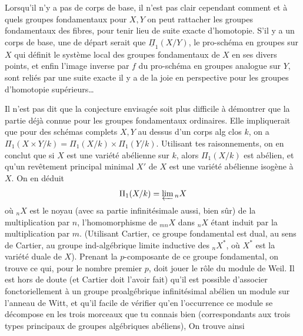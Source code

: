 Lorsqu'il n'y a pas de corps de base, il n'est pas clair cependant comment et à quels groupes fondamentaux  pour $X,Y$ on peut rattacher  les groupes fondamentaux des fibres, pour tenir lieu de suite exacte d'homotopie. S'il y a un corps de base, une   de départ serait que  $\underline\Pi_1(X/Y)$, le pro-schéma en groupes  sur $X$ qui définit le système local des groupes fondamentaux  de $X$ en ses divers points, et enfin l'image inverse par $f$ du pro-schéma en groupes analogue  sur $Y$, sont reliés par une suite exacte  il y a de la joie en perspective pour les groupes d'homotopie supérieurs\ldots

Il n'est pas dit que la conjecture envisagée soit plus difficile à démontrer que la partie déjà connue pour les groupes fondamentaux ordinaires. Elle impliquerait que pour des schémas complets $X,Y$ au dessus d'un corps alg clos $k$, on a $\Pi_1(X\times Y/k)=\Pi_1(X/k)\times\Pi_1(Y/k)$. Utilisant tes raisonnements, on en conclut que si $X$ est une variété abélienne sur $k$, alors $\Pi_1(X/k)$ est abélien, et qu'un revêtement principal minimal $X'$ de $X$ est une variété abélienne isogène à $X$. On en déduit
\[
\Pi_1(X/k)=\varprojlim {}_nX
\]
où ${}_nX$ est le noyau (avec sa partie infinitésimale aussi, bien sûr) de la multiplication par $n$, l'homomorphisme de ${}_{mn}X$ dans ${}_nX$ étant induit par la multiplication par $m$. (Utilisant Cartier, ce groupe fondamental est dual, au sens de Cartier, au groupe ind-algébrique limite inductive des ${}_nX^*$, où $X^*$ est la variété duale de $X$). Prenant la $p$-composante de ce groupe fondamental, on trouve ce qui, pour le nombre premier $p$, doit jouer le rôle du module de Weil. Il est hors de doute (et Cartier doit l'avoir fait) qu'il est possible d'associer  fonctoriellement à un groupe proalgébrique infinitésimal abélien un module sur l'anneau de Witt, et  qu'il  facile de vérifier qu'en l'occurrence ce module se décompose en les trois morceaux que tu connais bien (correspondants aux trois types principaux de groupes algébriques abéliens),  On trouve ainsi

